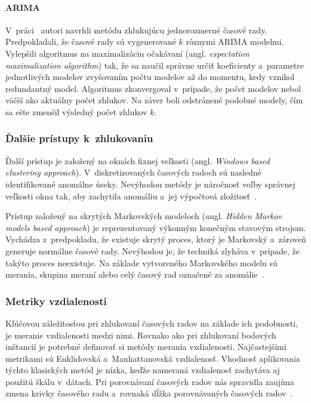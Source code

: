 \documentclass[a4paper,twoside,slovak,12pt,appendix]{article}
\begin{document}
\paragraph{ARIMA}
V~práci~\cite{Xiong2002} autori navrhli metódu zhlukujúcu jednorozmerné časové
rady. Predpokladali, že časové rady sú vygenerované $k$ rôznymi ARIMA modelmi.
Vylepšili algoritmus na maximalizáciu očakávaní (angl. \textit{expectation
maximalization algorithm}) tak, že sa naučil správne určiť koeficienty
a~parametre jednotlivých modelov zvyšovaním počtu modelov až do momentu, kedy
vznikol redundantný model. Algoritmus zkonvergoval v~prípade, že počet modelov
nebol väčší ako aktuálny počet zhlukov. Na záver boli odstránené podobné modely,
čím sa ešte zmenšil výsledný počet zhlukov $k$.

\subsubsection{Ďalšie prístupy k~zhlukovaniu}
Ďalší prístup je založený na oknách fixnej veľkosti (angl. \textit{Windows based
clustering approach}). V~diskretizovaných časových radoch sú nasledné
identifikované anomálne úseky. Nevýhodou metódy je náročnosť voľby správnej
veľkosti okna tak, aby zachytila anomáliu a~jej výpočtová
zložitosť~\cite{Teng2010}.

Prístup založený na skrytých Markovských modeloch (angl. \textit{Hidden Markov
models based approach}) je reprezentovaný výkonným konečným stavovým strojom.
Vychádza z~predpokladu, že existuje skrytý proces, ktorý je Markovský a~zároveň
generuje normálne časové rady. Nevýhodou je, že techniká zlyháva v~prípade, že
takýto proces neexistuje. Na základe vytvoreného Markovského modelu sú merania,
skupina meraní alebo celý časový rad označené za anomálie~\cite{Teng2010}.


\subsubsection{Metriky vzdialenosti}
\label{c:distance-metrics}
Kľúčovou záležitosťou pri zhlukovaní časových radov na základe ich podobnosti,
je meranie vzdialenosti medzi nimi. Rovnako ako pri zhlukovaní bodových
inštancií je potrebné definovať si metódy merania vzdialenosti. Najčastejšími
metrikami sú Euklidovská a~Manhattanovská vzdialenosť. Vhodnosť aplikovania
týchto klasických metód je nízka, keďže nameraná vzdialenosť zachytáva aj
použitú škálu v~dátach. Pri porovnávaní časových radov nás spravidla zaujíma
zmena krivky časového radu a~rovnaká dĺžka porovnávaných časových
radov~\cite{Dzeroski2007,WarrenLiao2005}.
\end{document}

